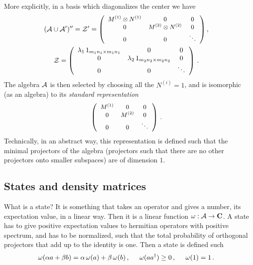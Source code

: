 \documentclass[12pt]{article}
\numberwithin{equation}{section}
\newcommand{\be}{\begin{equation}}
\newcommand{\ee}{\end{equation}}
\begin{document}
More explicitly, in  a basis which diagonalizes the center we have
\begin{multline}
\small \small\small
({\cal A}\cup {\cal A}')''={\cal Z}'=
\left(\begin{array}{ccc}
  M^{(1)}\otimes N^{(1)} & 0 & 0\\
  0 & M^{(2)}\otimes N^{(2)} & 0 \\
  0 & 0 & \ddots
\end{array}\right), \\  {\cal Z}=
\left(\begin{array}{ccc}
  \lambda_1\,1_{m_1 n_1\times m_1 n_1} & 0 & 0 \\
  0 & \lambda_2\, 1_{m_2 n_2\times m_2 n_2} &  0 \\
  0 & 0 & \ddots
\end{array}\right)\,.
\end{multline} 
The algebra ${\cal A}$ is then selected by choosing all the $N^{(i)}=1$, and is isomorphic (as an algebra) to its {\sl standard representation}
\begin{equation}\small
 \left(\begin{array}{ccc}
  M^{(1)} & 0 & 0 \\
  0 & M^{(2)} & 0\\
  0 & 0 & \ddots
\end{array}\right)\,.
\end{equation}
Technically, in an abstract way, this representation is defined such that the minimal projectors of the algebra (projectors such that there are no other projectors onto smaller subspaces) are of dimension $1$.  

\subsection{States and density matrices}

What is a state? It is something that takes an operator and gives a number, its expectation value, in a linear way. Then it is a linear function $\omega: {\cal A}\rightarrow {\mathbf{C}}$. A state has to give positive expectation values to hermitian operators with positive spectrum, and has to be normalized, such that the total probability of orthogonal projectors that add up to the identity is one. Then a state is defined such 
\be
\omega(\alpha a+ \beta b)=\alpha \,\omega(a)+\beta\, \omega(b)\,, \hspace{.5cm} \omega(a a^\dagger)\ge 0\,, \hspace{0.5cm} \omega(1)=1\,. 
\ee 
 
\end{document}
